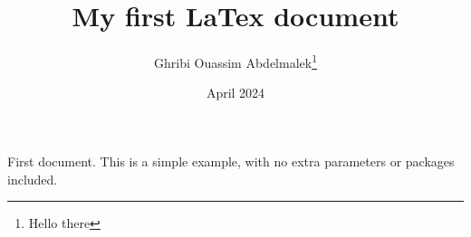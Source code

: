 \documentclass[12pt, a4paper]{article}
\title{My first LaTex document}
\author{Ghribi Ouassim Abdelmalek\thanks{Hello there}}
\date{April 2024}
\begin{document}
\maketitle
First document. This is a simple example, with no
extra parameters or packages included.
\end{document}

